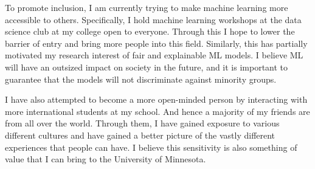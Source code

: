 \documentclass[12pt]{article}
\begin{document}
To promote inclusion, I am currently trying to make machine learning more accessible to others. Specifically, I hold machine learning workshops at the data science club at my college open to everyone. Through this I hope to lower the barrier of entry and bring more people into this field. Similarly, this has partially motivated my research interest of fair and explainable ML models. I believe ML will have an outsized impact on society in the future, and it is important to guarantee that the models will not discriminate against minority groups.

I have also attempted to become a more open-minded person by interacting with more international students at my school. And hence a majority of my friends are from all over the world. Through them, I have gained exposure to various different cultures and have gained a better picture of the vastly different experiences that people can have. I believe this sensitivity is also something of value that I can bring to the University of Minnesota.
\end{document}
